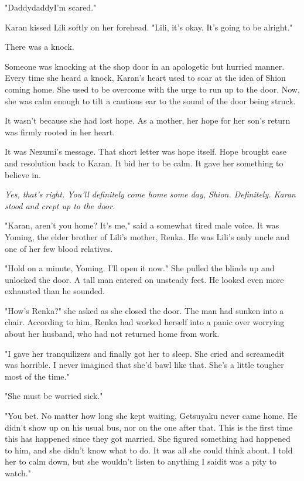 "Daddy\el daddy\el I'm scared."

Karan kissed Lili softly on her forehead. "Lili, it's okay. It's going
to be alright."

There was a knock.

Someone was knocking at the shop door in an apologetic but hurried
manner. Every time she heard a knock, Karan's heart used to soar at the
idea of Shion coming home. She used to be overcome with the urge to run
up to the door. Now, she was calm enough to tilt a cautious ear to the
sound of the door being struck.

It wasn't because she had lost hope. As a mother, her hope for her son's
return was firmly rooted in her heart.


It was Nezumi's message. That short letter was hope itself. Hope brought
ease and resolution back to Karan. It bid her to be calm. It gave her
something to believe in.


\emph{Yes, that's right. You'll definitely come home some day, Shion.
Definitely. Karan stood and crept up to the door.}

"Karan, aren't you home? It's me," said a somewhat tired male voice. It
was Yoming, the elder brother of Lili's mother, Renka. He was Lili's
only uncle and one of her few blood relatives.

"Hold on a minute, Yoming. I'll open it now." She pulled the blinds up
and unlocked the door. A tall man entered on unsteady feet. He looked
even more exhausted than he sounded.

"How's Renka?" she asked as she closed the door. The man had sunken into
a chair. According to him, Renka had worked herself into a panic over
worrying about her husband, who had not returned home from work.

"I gave her tranquilizers and finally got her to sleep. She cried and
screamed\el it was horrible. I never imagined that she'd bawl like that.
She's a little tougher most of the time."

"She must be worried sick."

"You bet. No matter how long she kept waiting, Getsuyaku never came
home. He didn't show up on his usual bus, nor on the one after that.
This is the first time this has happened since they got married. She
figured something had happened to him, and she didn't know what to do.
It was all she could think about. I told her to calm down, but she
wouldn't listen to anything I said\el it was a pity to watch."

